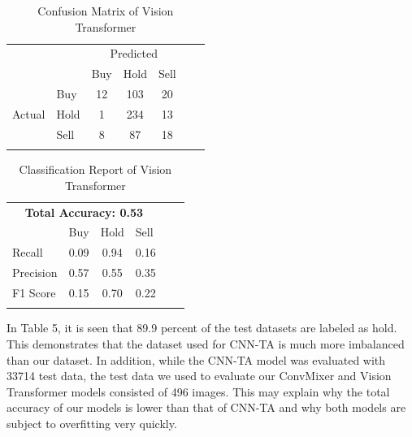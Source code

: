 \documentclass{article}
\begin{document}
\begin{table}[H]
    \centering
    \caption{Confusion Matrix of Vision Transformer}
    \begin{tabular}{llcccll}
        \cline{1-5}
        \multicolumn{1}{|l|}{} & \multicolumn{1}{l|}{} & \multicolumn{3}{c|}{Predicted} & & \\\cline{1-5} \multicolumn{1}{|l|}{} & \multicolumn{1}{l|}{} & \multicolumn{1}{l|}{Buy} & \multicolumn{1}{l|}{Hold} & \multicolumn{1}{l|}{Sell} & & \\\cline{1-5} \multicolumn{1}{|c|}{\multirow{3}{*}{Actual}} & \multicolumn{1}{l|}{Buy} & \multicolumn{1}{c|}{12} & \multicolumn{1}{c|}{103} & \multicolumn{1}{c|}{20} & & \\\cline{2-5} \multicolumn{1}{|c|}{} & \multicolumn{1}{l|}{Hold} & \multicolumn{1}{c|}{1} & \multicolumn{1}{c|}{234} & \multicolumn{1}{c|}{13} & & \\\cline{2-5} \multicolumn{1}{|c|}{} & \multicolumn{1}{l|}{Sell} & \multicolumn{1}{c|}{8} & \multicolumn{1}{c|}{87} & \multicolumn{1}{c|}{18} & & \\\cline{1-5} & & \multicolumn{1}{l}{} & \multicolumn{1}{l}{} & \multicolumn{1}{l}{} & & 
    \end{tabular}
\end{table}
\begin{table}[H]
    \centering
    \caption{Classification Report of Vision Transformer}
    \begin{tabular}{lcccll}
        \cline{1-4}
        \multicolumn{4}{|c|}{\textbf{Total Accuracy: 0.53}} & & \\\cline{1-4} \multicolumn{1}{|l|}{} & \multicolumn{1}{l|}{Buy} & \multicolumn{1}{l|}{Hold} & \multicolumn{1}{l|}{Sell} & & \\ \cline{1-4} \multicolumn{1}{|l|}{Recall} & \multicolumn{1}{c|}{0.09} & \multicolumn{1}{c|}{0.94} & \multicolumn{1}{c|}{0.16} & & \\\cline{1-4} \multicolumn{1}{|l|}{Precision} & \multicolumn{1}{c|}{0.57} & \multicolumn{1}{c|}{0.55} & \multicolumn{1}{c|}{0.35} & & \\\cline{1-4} \multicolumn{1}{|l|}{F1 Score} & \multicolumn{1}{c|}{0.15} & \multicolumn{1}{c|}{0.70} & \multicolumn{1}{c|}{0.22} & & \\\cline{1-4} & \multicolumn{1}{l}{} & \multicolumn{1}{l}{} & \multicolumn{1}{l}{} & &
    \end{tabular}
\end{table}
\noindent
In Table 5, it is seen that 89.9 percent of the test datasets are labeled as hold. This demonstrates that the dataset used for CNN-TA is much more imbalanced than our dataset. In addition, while the CNN-TA model was evaluated with 33714 test data, the test data we used to evaluate our ConvMixer and Vision Transformer models consisted of 496 images. This may explain why the total accuracy of our models is lower than that of CNN-TA and why both models are subject to overfitting very quickly.
\end{document}
